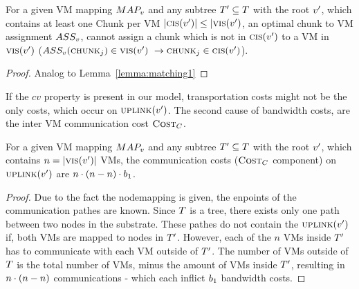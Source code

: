 \begin{lemma}
\label{lemma:matching2}
For a given VM mapping $MAP_v$ and any subtree $T' \subseteq 
T$ with the root $v'$, which contains at least one Chunk per 
VM $|\textsc{cis}(v')| \leq |\textsc{vis}(v')$, an 
optimal chunk to VM assignment $ASS_v$, cannot assign a chunk 
which is not in $\textsc{cis}(v')$ to a VM in 
$\textsc{vis}(v')$ ($ASS_v(\textsc{chunk}_j) \in 
\textsc{vis}(v')~ \rightarrow \textsc{chunk}_j \in 
\textsc{cis}(v')$).
\end{lemma}

\begin{proof}
 Analog to Lemma~\ref{lemma:matching1}
\end{proof}

If the $cv$ property is present in our model, transportation costs might not be 
the only costs, which occur on $\textsc{uplink}(v')$. The second cause of 
bandwidth costs, are the inter VM communication cost $\textsc{Cost}_C$.

\begin{corollary}
\label{corollary:comCost}
 For a given VM mapping $MAP_v$ and any subtree $T' \subseteq 
T$ with the root $v'$, which contains $n 
= |\textsc{vis}(v')|$ VMs, the communication costs ($\textsc{Cost}_C$ 
component) on 
$\textsc{uplink}(v')$ are $n \cdot (n - n) 
\cdot 
b_1$.
\end{corollary}

\begin{proof}
Due to the fact the nodemapping is given, the enpoints of the communication 
pathes are known. Since $T$ is a tree, there exists only one path between 
two nodes in the substrate. These pathes do not contain the 
$\textsc{uplink}(v')$ if, both VMs are mapped to nodes in $T'$. 
However, each of the $n$ VMs inside $T'$ has to communicate with each VM 
outside of $T'$. The number of VMs outside of $T$ is the total number 
of VMs, minus the amount of VMs inside $T'$, resulting in $n \cdot (n - 
n)$ communications - which each inflict $b_1$ bandwidth costs.
\end{proof}



%
\newcommand{\NodesToProcess}{\ensuremath{\textsc{nodesToProcess}}}

